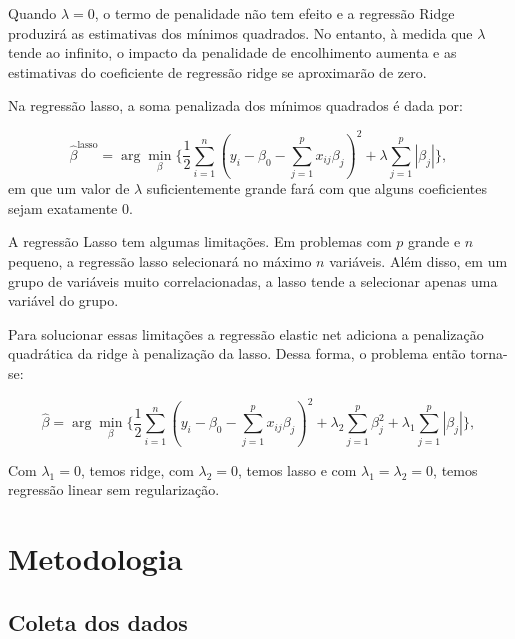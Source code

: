 \documentclass[
  12pt,
  a4paper,
]{scrreprt}
\begin{document}
\vspace{12pt}

Quando \(\lambda = 0\), o termo de penalidade não tem efeito e a
regressão Ridge produzirá as estimativas dos mínimos quadrados. No
entanto, à medida que \(\lambda\) tende ao infinito, o impacto da
penalidade de encolhimento aumenta e as estimativas do coeficiente de
regressão ridge se aproximarão de zero.

\vspace{12pt}

Na regressão lasso, a soma penalizada dos mínimos quadrados é dada por:

\[
\hat{\beta}^{\text{lasso}} = \arg \min_{\beta} \Biggl\{\frac{1}{2}\sum_{i = 1}^{n}\left(y_{i} - \beta_{0} - \sum_{j=1}^{p}x_{ij}\beta_{j}\right)^2 + \lambda \sum_{j=1}^{p}|\beta_{j}| \Biggl\}\text{, }
\] em que um valor de \(\lambda\) suficientemente grande fará com que
alguns coeficientes sejam exatamente 0.

\vspace{12pt}

A regressão Lasso tem algumas limitações. Em problemas com \(p\) grande
e \(n\) pequeno, a regressão lasso selecionará no máximo \(n\)
variáveis. Além disso, em um grupo de variáveis muito correlacionadas, a
lasso tende a selecionar apenas uma variável do grupo.

\vspace{12pt}

Para solucionar essas limitações a regressão elastic net adiciona a
penalização quadrática da ridge à penalização da lasso. Dessa forma, o
problema então torna-se:

\[
\hat{\beta} = \arg \min_{\beta} \Biggl\{\frac{1}{2}\sum_{i = 1}^{n}\left(y_{i} - \beta_{0} - \sum_{j=1}^{p}x_{ij}\beta_{j}\right)^2 + \lambda_{2} \sum_{j=1}^{p}\beta_{j}^2 + \lambda_{1} \sum_{j=1}^{p}|\beta_{j}| \Biggl\}\text{, }
\]

\vspace{12pt}

Com \(\lambda_{1} = 0\), temos ridge, com \(\lambda_{2} = 0\), temos
lasso e com \(\lambda_{1} = \lambda_{2} = 0\), temos regressão linear
sem regularização.

\chapter{Metodologia}\label{metodologia}

\section{Coleta dos dados}\label{coleta-dos-dados}
\end{document}
